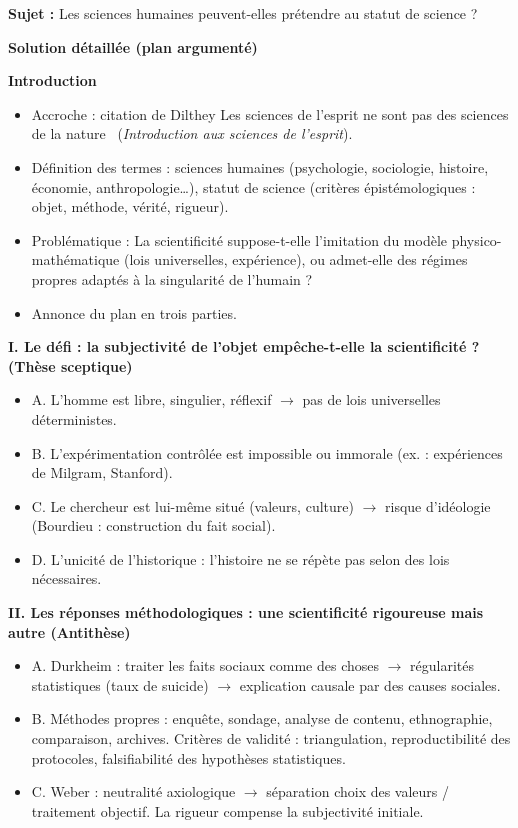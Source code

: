 \documentclass[11pt]{article}
\newcommand{\cle}[1]{{\popxbold\color{popdark}#1}}
\begin{document}
\begin{exoresolu}
\textbf{Sujet :} \guillemotleft Les sciences humaines peuvent-elles prétendre au statut de science ? \guillemotright

\textbf{Solution détaillée (plan argumenté)}

\textbf{Introduction}
\begin{itemize}
    \item Accroche : citation de Dilthey \guillemotleft Les sciences de l'esprit ne sont pas des sciences de la nature \guillemotright\ (\emph{Introduction aux sciences de l'esprit}).
    \item Définition des termes : \cle{sciences humaines} (psychologie, sociologie, histoire, économie, anthropologie…), \cle{statut de science} (critères épistémologiques : objet, méthode, vérité, rigueur).
    \item Problématique : La scientificité suppose-t-elle l'imitation du modèle physico-mathématique (lois universelles, expérience), ou admet-elle des régimes propres adaptés à la singularité de l'humain ?
    \item Annonce du plan en trois parties.
\end{itemize}

\textbf{I. Le défi : la subjectivité de l'objet empêche-t-elle la scientificité ? (Thèse sceptique)}
\begin{itemize}
    \item A. L'homme est libre, singulier, réflexif $\rightarrow$ pas de lois universelles déterministes.
    \item B. L'expérimentation contrôlée est impossible ou immorale (ex. : expériences de Milgram, Stanford).
    \item C. Le chercheur est lui-même situé (valeurs, culture) $\rightarrow$ risque d'idéologie (Bourdieu : construction du fait social).
    \item D. L'unicité de l'historique : l'histoire ne se répète pas selon des lois nécessaires.
\end{itemize}

\textbf{II. Les réponses méthodologiques : une scientificité rigoureuse mais autre (Antithèse)}
\begin{itemize}
    \item A. Durkheim : traiter les faits sociaux comme des choses $\rightarrow$ régularités statistiques (taux de suicide) $\rightarrow$ explication causale par des causes sociales.
    \item B. Méthodes propres : enquête, sondage, analyse de contenu, ethnographie, comparaison, archives. Critères de validité : triangulation, reproductibilité des protocoles, falsifiabilité des hypothèses statistiques.
    \item C. Weber : neutralité axiologique $\rightarrow$ séparation choix des valeurs / traitement objectif. La rigueur compense la subjectivité initiale.
\end{itemize}


\end{exoresolu}
\end{document}
